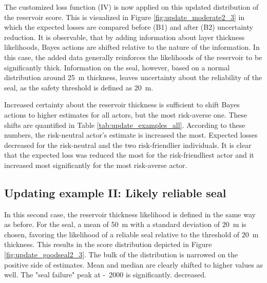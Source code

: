 	The customized loss function (IV) is now applied on this updated distribution of the reservoir score. This is visualized in Figure \ref{fig:update_moderate2_3} in which the expected losses are compared before (B1) and after (B2) uncertainty reduction. It is observable, that by adding information about layer thickness likelihoods, Bayes actions are shifted relative to the nature of the information. In this case, the added data generally reinforces the likelihoods of the reservoir to be significantly thick. Information on the seal, however, based on a normal distribution around 25~m thickness, leaves uncertainty about the reliability of the seal, as the safety threshold is defined as 20~m. 
	
	Increased certainty about the reservoir thickness is sufficient to shift Bayes actions to higher estimates for all actors, but the most risk-averse one. These shifts are quantified in Table \ref{tab:update_examples_all}. According to these numbers, the risk-neutral actor's estimate is increased the most. Expected losses decreased for the risk-neutral and the two risk-friendlier individuals. It is clear that the expected loss was reduced the most for the risk-friendliest actor and it increased most significantly for the most risk-averse actor.
	
	\subsection{Updating example II: Likely reliable seal}
	
	In this second case, the reservoir thickness likelihood is defined in the same way as before. For the seal, a mean of 50~m with a standard deviation of 20~m is chosen, favoring the likelihood of a reliable seal relative to the threshold of 20~m thickness. This results in the score distribution depicted in Figure \ref{fig:update_goodseal2_3}. The bulk of the distribution is narrowed on the positive side of estimates. Mean and median are clearly shifted to higher values as well. The "seal failure" peak at -~2000 is significantly. decreased.
	
